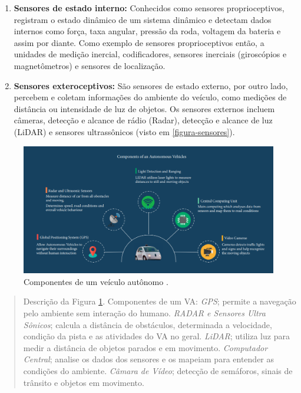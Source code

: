 \begin{enumerate}
 \item \textbf{Sensores de estado interno:} Conhecidos como sensores proprioceptivos, registram o estado dinâmico de um sistema dinâmico e detectam dados internos como força, taxa angular, pressão da roda, voltagem da bateria e assim por diante. Como exemplo de sensores proprioceptivos então, a unidades de medição inercial, codificadores, sensores inerciais (giroscópios e magnetômetros) e sensores de localização. 
\item \textbf{Sensores exteroceptivos:} São sensores de estado externo, por outro lado, percebem e coletam informações do ambiente do veículo, como medições de distância ou intensidade de luz de objetos. Os sensores externos incluem câmeras, detecção e alcance de rádio (Radar), detecção e alcance de luz (LiDAR) e sensores ultrassônicos (visto em \ref{figura-sensores}).

\end{enumerate}



\begin{figure}[H]
\centering
\includegraphics[width=\textwidth]{Figures/compo.png}
\caption{Componentes de um veículo autônomo \cite{aplicacao2}.}
\label{figura_compone}
\end{figure}

\begin{quote}
Descrição da Figura \ref{figura_compone}. Componentes de um VA: \textit{GPS}; permite a navegação pelo ambiente sem interação do humano. \textit{RADAR e Sensores Ultra Sônicos}; calcula a distância de obstáculos, determinada a velocidade, condição da pista e as atividades do VA no geral. \textit{LiDAR}; utiliza luz para medir a distância de objetos parados e em movimento. \textit{Computador Central}; analise os dados dos sensores e os mapeiam para entender as condições do ambiente. \textit{Câmara de Vídeo}; detecção de semáforos, sinais de trânsito e objetos em movimento.
\end{quote}

